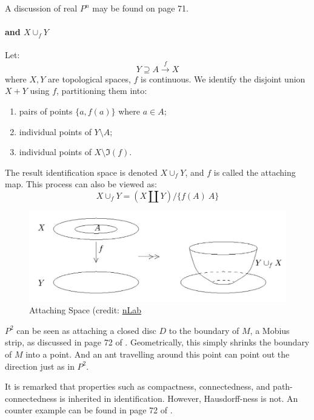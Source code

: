 \documentclass{article}
\begin{document}
\begin{defi}
    A discussion of real $P^n$ may be found on page 71.
\end{defi}

\paragraph{ and $X\cup_f Y$} Let:
\begin{equation}
    Y \supseteq A \overset{f}{\to} X
\end{equation}
where $X,Y$ are topological spaces, $f$ is continuous. We identify the
disjoint union $X+Y$ using $f$, partitioning them into:
\begin{enumerate}
    \item pairs of points $\{a,f(a)\}$ where $a\in A$;
    \item individual points of $Y\setminus A$;
    \item individual points of $X\setminus \Im(f)$.
\end{enumerate}
The result identification space is denoted $X\cup_f Y$, and $f$ is
called the attaching map. This process can also be viewed as:
\begin{equation}
    X\cup_f Y = (X\amalg Y)/\{f(A)~A\}
\end{equation}
\begin{figure}[H]
    \centering
    \includegraphics[width=0.6\linewidth]{pics/Attaching-Space.jpg}
    \caption{Attaching Space (credit:
        \href{https://ncatlab.org/nlab/show/Top}{nLab}}
\end{figure}
\begin{ex}
    $P^2$ can be seen as attaching a closed disc $D$ to the boundary
    of $M$, a Mobius strip, as discussed in page 72 of \cite{book}.
    Geometrically, this simply shrinks the boundary of $M$ into a
    point. And an ant travelling around this point can point out the
    direction just as in $P^2$.
\end{ex}
\begin{remark}
    It is remarked that properties such as compactness, connectedness,
    and path-connectedness is inherited in identification. However,
    Hausdorff-ness is not. An counter example can be found in page 72 of
    \cite{book}.
\end{remark}
\end{document}
